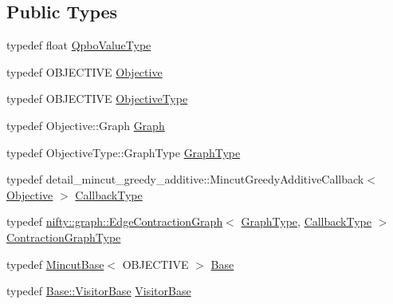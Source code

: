 \subsection*{Public Types}
\begin{DoxyCompactItemize}
\item 
typedef float \hyperlink{classnifty_1_1graph_1_1mincut_1_1MincutGreedyAdditive_a461d46db5c28a47552377ca8b57db31f}{Qpbo\+Value\+Type}
\item 
typedef O\+B\+J\+E\+C\+T\+I\+V\+E \hyperlink{classnifty_1_1graph_1_1mincut_1_1MincutGreedyAdditive_a53eab6ae6b54a84335e3715d197c203b}{Objective}
\item 
typedef O\+B\+J\+E\+C\+T\+I\+V\+E \hyperlink{classnifty_1_1graph_1_1mincut_1_1MincutGreedyAdditive_a589ceb1dbedf182e2b557ce930cd0e88}{Objective\+Type}
\item 
typedef Objective\+::\+Graph \hyperlink{classnifty_1_1graph_1_1mincut_1_1MincutGreedyAdditive_adbc5d902d56346bd222c951ba5948d09}{Graph}
\item 
typedef Objective\+Type\+::\+Graph\+Type \hyperlink{classnifty_1_1graph_1_1mincut_1_1MincutGreedyAdditive_a791534df9aec04248e1931ca6c2cf764}{Graph\+Type}
\item 
typedef detail\+\_\+mincut\+\_\+greedy\+\_\+additive\+::\+Mincut\+Greedy\+Additive\+Callback$<$ \hyperlink{classnifty_1_1graph_1_1mincut_1_1MincutGreedyAdditive_a53eab6ae6b54a84335e3715d197c203b}{Objective} $>$ \hyperlink{classnifty_1_1graph_1_1mincut_1_1MincutGreedyAdditive_ae6b2e0ee7b987b72e961224161b68c0a}{Callback\+Type}
\item 
typedef \hyperlink{classnifty_1_1graph_1_1EdgeContractionGraph}{nifty\+::graph\+::\+Edge\+Contraction\+Graph}$<$ \hyperlink{classnifty_1_1graph_1_1mincut_1_1MincutGreedyAdditive_a791534df9aec04248e1931ca6c2cf764}{Graph\+Type}, \hyperlink{classnifty_1_1graph_1_1mincut_1_1MincutGreedyAdditive_ae6b2e0ee7b987b72e961224161b68c0a}{Callback\+Type} $>$ \hyperlink{classnifty_1_1graph_1_1mincut_1_1MincutGreedyAdditive_a12888919099a9985cffc747e7f3fc1ed}{Contraction\+Graph\+Type}
\item 
typedef \hyperlink{classnifty_1_1graph_1_1MincutBase}{Mincut\+Base}$<$ O\+B\+J\+E\+C\+T\+I\+V\+E $>$ \hyperlink{classnifty_1_1graph_1_1mincut_1_1MincutGreedyAdditive_aeb493d49b53f21cf9c644baa3b3d00f7}{Base}
\item 
typedef \hyperlink{classnifty_1_1graph_1_1MincutBase_a5ba378dc5a1fc073eb9449ca635e7648}{Base\+::\+Visitor\+Base} \hyperlink{classnifty_1_1graph_1_1mincut_1_1MincutGreedyAdditive_a813b2c55104d79a221b9dac3b0343ace}{Visitor\+Base}

\end{DoxyCompactItemize}

